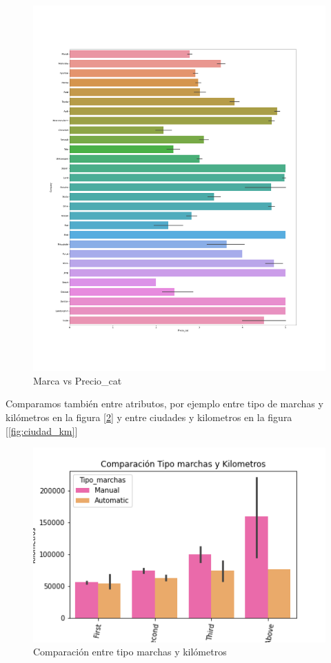 \documentclass[12pt,twoside]{report}
\begin{document}
\begin{figure}[H]
\includegraphics[width=\textwidth]{../notebooks/figures/company_precio_cat.png}
\caption{Marca vs Precio\_cat}
\label{fig:eda_marca_precio}
\end{figure}

Comparamos también entre atributos, por ejemplo entre tipo de marchas y kilómetros en la figura [\ref{fig:tipo_marchas_km}] y entre ciudades y kilometros en la figura [\ref{fig:ciudad_km}]

\begin{figure}[H]
\includegraphics[width=\textwidth]{../notebooks/figures/tipo_marchas_km.png}
\caption{Comparación entre tipo marchas y kilómetros}
\label{fig:tipo_marchas_km}
\end{figure} 
\end{document}
